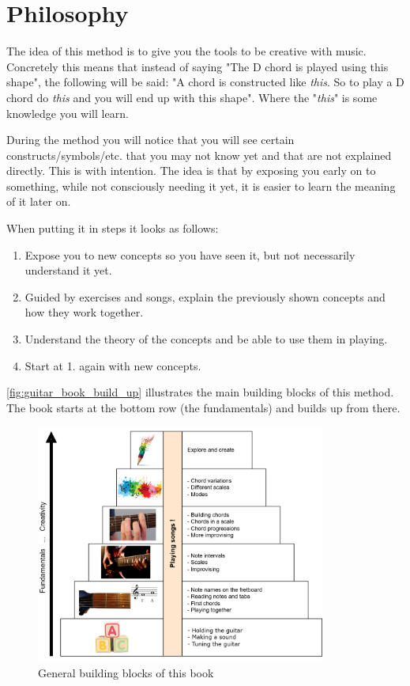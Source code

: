 \chapter{Philosophy}

The idea of this method is to give you the tools to be creative with music. Concretely this means that instead of saying "The D chord is played using this shape", the following will be said: "A chord is constructed like \textit{this}. So to play a D chord do \textit{this} and you will end up with this shape". Where the "\textit{this}" is some knowledge you will learn.

During the method you will notice that you will see certain constructs/symbols/etc. that you may not know yet and that are not explained directly. This is with intention. The idea is that by exposing you early on to something, while not consciously needing it yet, it is easier to learn the meaning of it later on.

When putting it in steps it looks as follows:

\begin{enumerate}
	\item Expose you to new concepts so you have seen it, but not necessarily understand it yet.
	\item Guided by exercises and songs, explain the previously shown concepts and how they work together.
	\item Understand the theory of the concepts and be able to use them in playing.
	\item Start at 1. again with new concepts.
\end{enumerate}

\autoref{fig:guitar_book_build_up} illustrates the main building blocks of this method. The book starts at the bottom row (the fundamentals) and builds up from there.

\begin{figure}[!b]
	\centering
	\includegraphics[width=0.85\textwidth]{../../Images/BookBuildup.png}
	\caption{General building blocks of this book}
	\label{fig:guitar_book_build_up}
\end{figure}